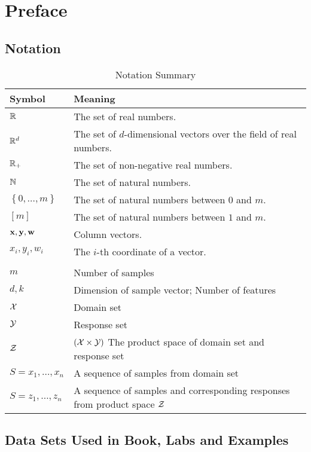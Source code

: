 \section{Preface}



\subsection{Notation}

\begin{table}[h!]
	\begin{center}
		\caption{Notation Summary}
		\label{tab:notation}
		\begin{tabular}{l|l}
			\textbf{Symbol} & \textbf{Meaning} \\
			\hline
			$\mathbb{R}$ & The set of real numbers. \\
			$\mathbb{R}^d$ & The set of $d$-dimensional vectors over the field of real numbers. \\
			$\mathbb{R}_+$ & The set of non-negative real numbers. \\
			$\mathbb{N}$ & The set of natural numbers. \\
			$\left\{0,\ldots,m\right\}$ & The set of natural numbers between $0$ and $m$. \\
			$\left[m\right]$ & The set of natural numbers between $1$ and $m$. \\
			$\mathbf{x},\mathbf{y},\mathbf{w}$ & Column vectors. \\
			$x_i,y_i,w_i$ & The $i$-th coordinate of a vector. \\
			\\
			\hline
			$m$ & Number of samples \\
			$d, k$ & Dimension of sample vector; Number of features \\
			$\mathcal{X}$ & Domain set \\
			$\mathcal{Y}$ & Response set \\
			$\mathcal{Z}$ & $\left(\mathcal{X}\times\mathcal{Y}\right)$ The product space of domain set and response set\\
			$S=x_1,\ldots,x_n$ & A sequence of samples from domain set \\
			$S=z_1,\ldots,z_n$ & A sequence of samples and corresponding responses from product space $\mathcal{Z}$ \\
		\end{tabular}
	\end{center}
\end{table}


\subsection{Data Sets Used in Book, Labs and Examples}